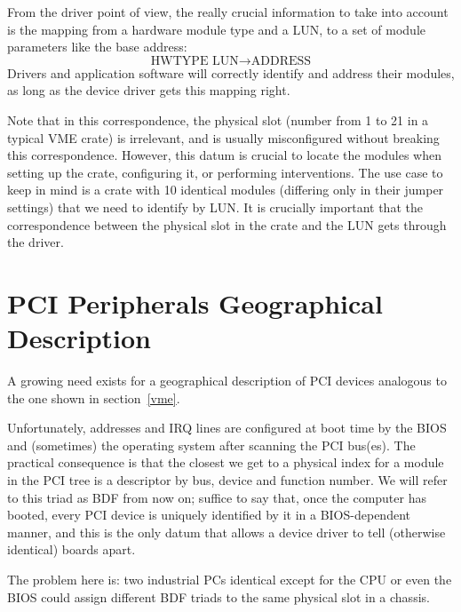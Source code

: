 \documentclass[12pt,a4paper]{article}
\begin{document}
From the driver point of view, the really crucial information to take
into account is the mapping from a hardware module type and a LUN, to a
set of module parameters like the base address:
\begin{equation*}
\text{HWTYPE LUN} \to \text{ADDRESS}
\end{equation*}
Drivers and application software will correctly identify and address
their modules, as long as the device driver gets this mapping right.

Note that in this correspondence, the physical slot (number from 1 to
21 in a typical VME crate) is irrelevant, and is usually misconfigured
without breaking this correspondence. However, this datum is crucial to
locate the modules when setting up the crate, configuring it, or
performing interventions. The use case to keep in mind is a crate with
10 identical modules (differing only in their jumper settings) that we
need to identify by LUN. It is crucially important that the
correspondence between the physical slot in the crate and the LUN gets
through the driver.

\section{PCI Peripherals Geographical Description}
\label{pci}

A growing need exists for a geographical description of PCI devices
analogous to the one shown in section~\ref{vme}.

Unfortunately, addresses and IRQ lines are configured
at boot time by the BIOS and (sometimes) the operating
system after scanning the PCI bus(es).
The practical consequence is that the closest we get to a
physical index for a module in the PCI tree is a descriptor by bus,
device and function number. We will refer to this triad as BDF from now
on; suffice to say that, once the computer has booted, every PCI device
is uniquely identified by it in a BIOS-dependent manner, and this is the
only datum that allows a device driver to tell (otherwise identical)
boards apart.

The problem here is: two industrial PCs identical except for the CPU or
even the BIOS could assign different BDF triads to the same physical
slot in a chassis.
\end{document}
